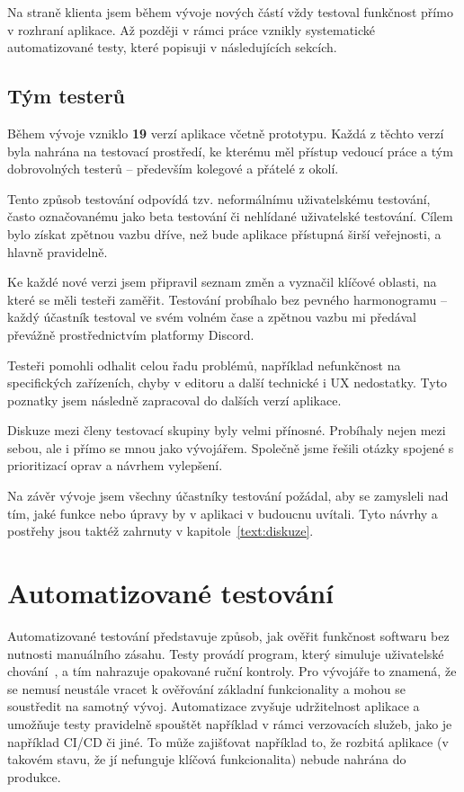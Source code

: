 Na straně klienta jsem během vývoje nových částí vždy testoval funkčnost přímo v rozhraní aplikace.
Až později v rámci práce vznikly systematické automatizované testy, které popisuji v následujících sekcích.

\subsection{Tým testerů}

Během vývoje vzniklo \textbf{19} verzí aplikace včetně prototypu. 
Každá z těchto verzí byla nahrána na testovací prostředí, ke kterému měl přístup vedoucí práce a tým dobrovolných testerů -- především kolegové a přátelé z okolí.

Tento způsob testování odpovídá tzv. neformálnímu uživatelskému testování, často označovanému jako beta testování či nehlídané uživatelské testování. 
Cílem bylo získat zpětnou vazbu dříve, než bude aplikace přístupná širší veřejnosti, a hlavně pravidelně.

Ke každé nové verzi jsem připravil seznam změn a vyznačil klíčové oblasti, na které se měli testeři zaměřit. 
Testování probíhalo bez pevného harmonogramu -- každý účastník testoval ve svém volném čase a zpětnou vazbu mi předával převážně prostřednictvím platformy Discord.

Testeři pomohli odhalit celou řadu problémů, například nefunkčnost na specifických zařízeních, chyby v editoru a další technické i UX nedostatky. 
Tyto poznatky jsem následně zapracoval do dalších verzí aplikace.

Diskuze mezi členy testovací skupiny byly velmi přínosné.
Probíhaly nejen mezi sebou, ale i přímo se mnou jako vývojářem. 
Společně jsme řešili otázky spojené s prioritizací oprav a návrhem vylepšení.

Na závěr vývoje jsem všechny účastníky testování požádal, aby se zamysleli nad tím, jaké funkce nebo úpravy by v aplikaci v budoucnu uvítali. 
Tyto návrhy a postřehy jsou taktéž zahrnuty v kapitole~\ref{text:diskuze}.

\section{Automatizované testování}

Automatizované testování představuje způsob, jak ověřit funkčnost softwaru bez nutnosti manuálního zásahu.
Testy provádí program, který simuluje uživatelské chování~\cite{meszaros_2007}, a tím nahrazuje opakované ruční kontroly.
Pro vývojáře to znamená, že se nemusí neustále vracet k ověřování základní funkcionality a mohou se soustředit na samotný vývoj. 
Automatizace zvyšuje udržitelnost aplikace a umožňuje testy pravidelně spouštět například v rámci verzovacích služeb, jako je například CI/CD či jiné.
To může zajišťovat například to, že rozbitá aplikace (v takovém stavu, že jí nefunguje klíčová funkcionalita) nebude nahrána do produkce.

